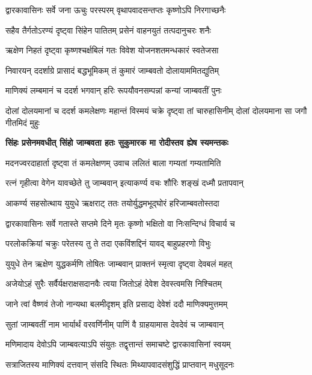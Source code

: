 \twolineshloka
{द्वारकावासिनः सर्वे जना ऊचुः परस्परम्}
{वृथापवादसन्तप्तः कृष्णोऽपि निरगाच्छनैः}%

\twolineshloka
{सहैव तैर्गतोऽरण्यं दृष्ट्वा सिंहेन पातितम्}
{प्रसेनं वाहनयुतं तत्पदानुचरः शनैः}%

\twolineshloka
{ऋक्षेण निहतं दृष्ट्वा कृष्णश्चर्क्षबिलं गतः}
{विवेश योजनशतमन्धकारं स्वतेजसा}%

\twolineshloka
{निवारयन् ददर्शाग्रे प्रासादं बद्धभूमिकम्}
{तं कुमारं जाम्बवतो दोलायाममितद्युतिम्}%

\twolineshloka
{माणिक्यं लम्बमानं च ददर्श भगवान् हरिः}
{रूपयौवनसम्पन्नां कन्यां जाम्बवतीं पुनः}%

\threelineshloka
{दोलां दोलयमानां च ददर्श कमलेक्षणः}
{महान्तं विस्मयं चक्रे दृष्ट्वा तां चारुहासिनीम्}
{दोलां दोलयमाना सा जगौ गीतमिदं मुहुः}%

\begingroup
\bfseries
\twolineshloka
{सिंहः प्रसेनमवधीत् सिंहो जाम्बवता हतः}
{सुकुमारक मा रोदीस्तव ह्येष स्यमन्तकः}%
\endgroup

\twolineshloka
{मदनज्वरदाहार्ता दृष्ट्वा तं कमलेक्षणम्}
{उवाच ललितं बाला गम्यतां गम्यतामिति}%

\twolineshloka
{रत्नं गृहीत्वा वेगेन यावच्छेते तु जाम्बवान्}
{इत्याकर्ण्य वचः शौरिः शङ्खं दध्मौ प्रतापवान्}%

\twolineshloka
{आकर्ण्य सहसोत्थाय युयुधे ऋक्षराट् ततः}
{तयोर्युद्धमभूद्घोरं हरिजाम्बवतोस्तदा}%

\twolineshloka
{द्वारकावासिनः सर्वे गतास्ते सप्तमे दिने}
{मृतः कृष्णो भक्षितो वा निःसन्दिग्धं विचार्य च}%

\twolineshloka
{परलोकक्रियां चक्रुः परेतस्य तु ते तदा}
{एकविंशद्दिनं यावद् बाहुप्रहरणो विभुः}%

\twolineshloka
{युयुधे तेन ऋक्षेण युद्धकर्मणि तोषितः}
{जाम्बवान् प्राक्तनं स्मृत्वा दृष्ट्वा देवबलं महत्}%


\twolineshloka
{अजेयोऽहं सुरैः सर्वैर्यक्षराक्षसदानवैः}
{त्वया जितोऽहं देवेश देवस्त्वमसि निश्चितम्}%

\twolineshloka
{जाने त्वां वैष्णवं तेजो नान्यथा बलमीदृशम्}
{इति प्रसाद्य देवेशं ददौ माणिक्यमुत्तमम्}%

\twolineshloka
{सुतां जाम्बवतीं नाम भार्यार्थं वरवर्णिनीम्}
{पाणिं वै ग्राहयामास देवदेवं च जाम्बवान्}%

\twolineshloka
{मणिमादाय देवोऽपि जाम्बवत्याऽपि संयुतः}
{तद्वृत्तान्तं समाचष्टे द्वारकावासिनां स्वयम्}%

\twolineshloka
{सत्राजितस्य माणिक्यं दत्तवान् संसदि स्थितः}
{मिथ्यापवादसंशुद्धिं प्राप्तवान् मधुसूदनः}%

